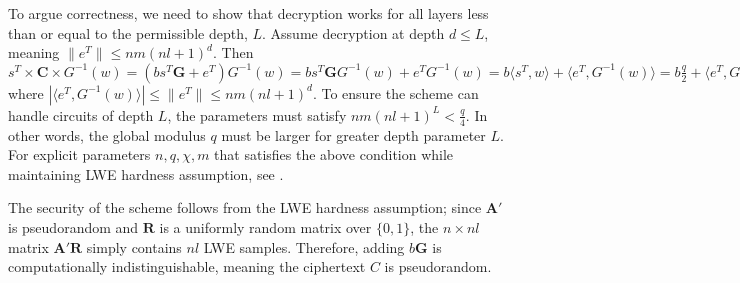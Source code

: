 To argue correctness, we need to show that decryption works for all layers less than or equal to the permissible depth, $L$. Assume decryption at depth $d \leq L$, meaning $\|e^T\| \leq nm(nl+1)^d$. Then $s^T \times \textbf{C} \times G^{-1}(w) =  (bs^T\textbf{G} + e^T)G^{-1}(w) = bs^T\textbf{G}G^{-1}(w) + e^TG^{-1}(w) = b\langle s^T, w\rangle + \langle e^T, G^{-1}(w)\rangle = b\frac{q}{2} + \langle e^T, G^{-1}(w)\rangle$ where $|\langle e^T, G^{-1}(w)\rangle | \leq \|e^T\| \leq nm(nl+1)^d$. To ensure the scheme can handle circuits of depth $L$, the parameters must satisfy $nm(nl+1)^L < \frac{q}{4}$. In other words, the global modulus $q$ must be larger for greater depth parameter $L$. For explicit parameters $n, q, \chi, m$ that satisfies the above condition while maintaining LWE hardness assumption, see \cite{Hal18}. 

The security of the scheme follows from the LWE hardness assumption; since $\textbf{A}'$ is pseudorandom and $\textbf{R}$ is a uniformly random matrix over $\{0,1\}$, the $n \times nl$ matrix $\textbf{A}'\textbf{R}$ simply contains $nl$ LWE samples. Therefore, adding $b\textbf{G}$ is computationally indistinguishable, meaning the ciphertext $C$ is pseudorandom.


